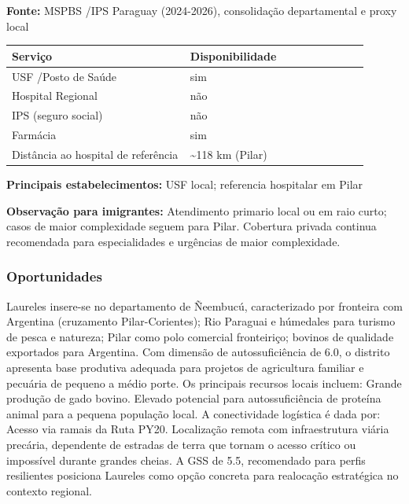\textbf{Fonte:} MSPBS /\allowbreak  IPS Paraguay (2024-2026), consolidação
departamental e proxy local

{\def\LTcaptype{none} %
\begin{longtable}{@{}>{\raggedright\arraybackslash}p{0.45\linewidth} >{\raggedright\arraybackslash}p{0.45\linewidth}@{}}
\toprule\noalign{}
Serviço & Disponibilidade \\
\midrule\noalign{}
\endhead
\bottomrule\noalign{}
\endlastfoot
USF /\allowbreak  Posto de Saúde & sim \\
Hospital Regional & não \\
IPS (seguro social) & não \\
Farmácia & sim \\
Distância ao hospital de referência & \textasciitilde118 km (Pilar) \\
\end{longtable}
}

\textbf{Principais estabelecimentos:} USF local; referencia hospitalar
em Pilar

\textbf{Observação para imigrantes:} Atendimento primario local ou em
raio curto; casos de maior complexidade seguem para Pilar. Cobertura
privada continua recomendada para especialidades e urgências de maior
complexidade.
\newpage

\subsubsection*{Oportunidades}\label{oport-laureles-1209}
Laureles insere-se no departamento de Ñeembucú, caracterizado por fronteira com Argentina (cruzamento Pilar-Corientes); Rio Paraguai e húmedales para turismo de pesca e natureza; Pilar como polo comercial fronteiriço; bovinos de qualidade exportados para Argentina. Com dimensão de autossuficiência de 6.0, o distrito apresenta base produtiva adequada para projetos de agricultura familiar e pecuária de pequeno a médio porte. Os principais recursos locais incluem: Grande produção de gado bovino. Elevado potencial para autossuficiência de proteína animal para a pequena população local. A conectividade logística é dada por: Acesso via ramais da Ruta PY20. Localização remota com infraestrutura viária precária, dependente de estradas de terra que tornam o acesso crítico ou impossível durante grandes cheias. A GSS de 5.5, recomendado para perfis resilientes posiciona Laureles como opção concreta para realocação estratégica no contexto regional.

